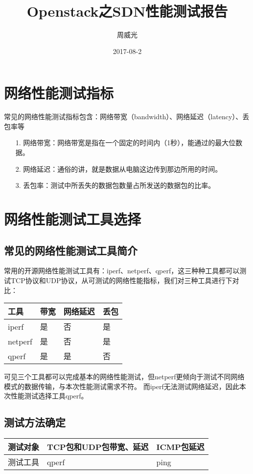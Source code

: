 \documentclass[a4paper,left=1.5cm,right=1.5cm,11pt]{article}
\title{Openstack之SDN性能测试报告}
\author{周威光}
\date{2017-08-2}
\begin{document}
\maketitle
\clearpage
\tableofcontents
\clearpage
\section{网络性能测试指标}
常见的网络性能测试指标包含：网络带宽（bandwidth）、网络延迟（latency）、丢包率等
\begin{itemize}
	\item[1.]网络带宽：网络带宽是指在一个固定的时间内（1秒），能通过的最大位数据。
	\item[2.]网络延迟：通俗的讲，就是数据从电脑这边传到那边所用的时间。
	\item[3.]丢包率：测试中所丢失的数据包数量占所发送的数据包的比率。
\end{itemize}

\section{网络性能测试工具选择}
\subsection{常见的网络性能测试工具简介}
常用的开源网络性能测试工具有：iperf、netperf、qperf，这三种种工具都可以测试TCP协议和UDP协议，从可测试的网络性能指标，我们对三种工具进行下对比：
\begin{center}
\begin{tabular}[c]{|l|l|l|l|}
\hline
工具 & 带宽 & 网络延迟 & 丢包 \\
\hline
iperf & 是 & 否 & 是 \\
\hline
netperf & 是 & 否 & 是 \\
\hline
qperf & 是 & 是 & 否 \\
\hline
\end{tabular}
\end{center}\par
可见三个工具都可以完成基本的网络性能测试，但netperf更倾向于测试不同网络模式的数据传输，与本次性能测试需求不符。
而iperf无法测试网络延迟，因此本次性能测试选择工具qperf。
\subsection{测试方法确定}
\begin{center}
\begin{tabular}[c]{|l|l|l|}
\hline
测试对象 & TCP包和UDP包带宽、延迟 & ICMP包延迟  \\
\hline
测试工具 & qperf & ping \\
\hline
\end{tabular}
\end{center}
\end{document}
